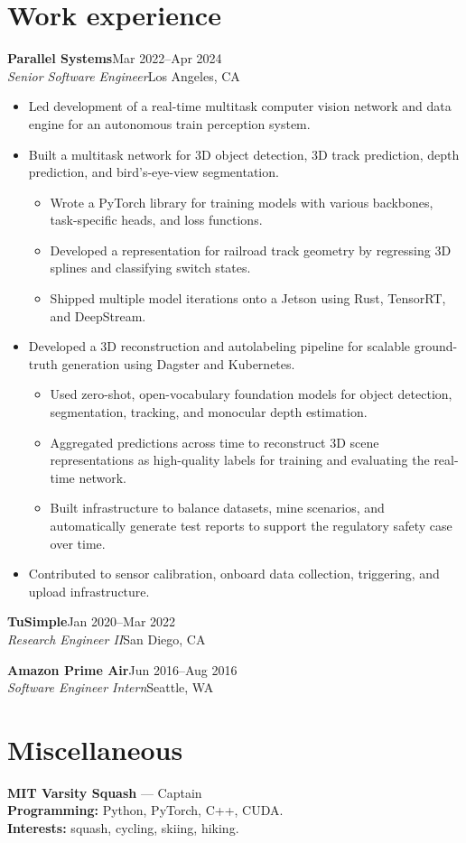 \documentclass[11pt,a4paper]{article}
\newcommand{\entry}[4]{%
  \addvspace{2pt}%
  \textbf{#1}\hfill\textcolor{muted}{\small #2}\\
  \textit{#3}\hfill\textcolor{muted}{\small #4}\par
}
\begin{document}
\section{Work experience}
\entry{Parallel Systems}{Mar 2022--Apr 2024}
{Senior Software Engineer}{Los Angeles, CA}
\begin{itemize}
  \item Led development of a real-time multitask computer vision network and data engine
  for an autonomous train perception system.
  \item Built a multitask network for 3D object detection, 3D track prediction,
  depth prediction, and bird's-eye-view segmentation.
  \begin{itemize}
    \item Wrote a PyTorch library for training models with various backbones,
    task-specific heads, and loss functions.
    \item Developed a representation for railroad track geometry by regressing 3D splines
    and classifying switch states.
    \item Shipped multiple model iterations onto a Jetson using Rust, TensorRT, and DeepStream.
  \end{itemize}
  \item Developed a 3D reconstruction and autolabeling pipeline for scalable ground-truth
  generation using Dagster and Kubernetes.
  \begin{itemize}
    \item Used zero-shot, open-vocabulary foundation models for object detection,
    segmentation, tracking, and monocular depth estimation.
    \item Aggregated predictions across time to reconstruct 3D scene representations
    as high-quality labels for training and evaluating the real-time network.
    \item Built infrastructure to balance datasets, mine scenarios, and automatically
    generate test reports to support the regulatory safety case over time.
  \end{itemize}
  \item Contributed to sensor calibration, onboard data collection, triggering,
  and upload infrastructure.
\end{itemize}

\entry{TuSimple}{Jan 2020--Mar 2022}{Research Engineer II}{San Diego, CA}

\entry{Amazon Prime Air}{Jun 2016--Aug 2016}{Software Engineer Intern}{Seattle, WA}

\section{Miscellaneous}
\textbf{MIT Varsity Squash} — Captain\\
\textbf{Programming:} Python, PyTorch, C++, CUDA.\\
\textbf{Interests:} squash, cycling, skiing, hiking.
\end{document}
